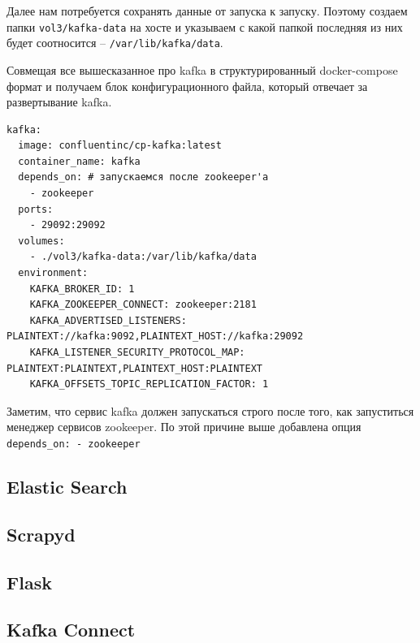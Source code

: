 Далее нам потребуется сохранять данные от запуска к запуску. Поэтому создаем
папки \verb|vol3/kafka-data| на хосте и указываем с какой папкой последняя из
них будет соотносится -- \verb|/var/lib/kafka/data|.

Совмещая все вышесказанное про kafka в структурированный docker-compose формат и
получаем блок конфигурационного файла, который отвечает за развертывание kafka.
\begin{verbatim}
kafka:
  image: confluentinc/cp-kafka:latest
  container_name: kafka
  depends_on: # запускаемся после zookeeper'а
    - zookeeper
  ports:
    - 29092:29092
  volumes:
    - ./vol3/kafka-data:/var/lib/kafka/data
  environment:
    KAFKA_BROKER_ID: 1
    KAFKA_ZOOKEEPER_CONNECT: zookeeper:2181
    KAFKA_ADVERTISED_LISTENERS: PLAINTEXT://kafka:9092,PLAINTEXT_HOST://kafka:29092
    KAFKA_LISTENER_SECURITY_PROTOCOL_MAP: PLAINTEXT:PLAINTEXT,PLAINTEXT_HOST:PLAINTEXT
    KAFKA_OFFSETS_TOPIC_REPLICATION_FACTOR: 1
\end{verbatim}

Заметим, что сервис kafka должен запускаться строго после того, как запуститься
менеджер сервисов zookeeper. По этой причине выше добавлена опция
\verb|depends_on: - zookeeper|

\subsection{Elastic Search}

\subsection{Scrapyd}
\subsection{Flask}
\subsection{Kafka Connect}
